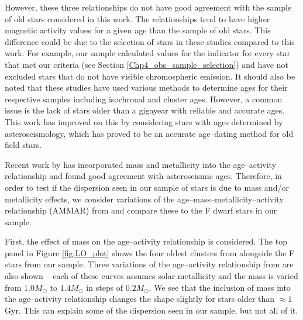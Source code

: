 However, these three relationships do not have good agreement with the sample of old stars considered in this work. The relationships tend to have higher magnetic activity values for a given age than the sample of old stars. This difference could be due to the selection of stars in these studies compared to this work. For example, our sample calculated values for the \Rprime indicator for every star that met our criteria (see Section \ref{Chp4_obs_sample_selection}) and have not excluded stars that do not have visible chromospheric emission. It should also be noted that these studies have used various methods to determine ages for their respective samples including isochronal and cluster ages. However, a common issue is the lack of stars older than a gigayear with reliable and accurate ages. This work has improved on this by considering stars with ages determined by asteroseismology, which has proved to be an accurate age--dating method for old field stars.

Recent work by \citet{Lorenzo_Oliveira_etal_2016} has incorporated mass and metallicity into the age--activity relationship and found good agreement with asteroseismic ages. Therefore, in order to test if the dispersion seen in our sample of stars is due to mass and/or metallicity effects, we consider variations of the age--mass--metallicity--activity relationship (AMMAR) from \citet{Lorenzo_Oliveira_etal_2016} and compare these to the F dwarf stars in our sample.

First, the effect of mass on the age--activity relationship is considered. The top panel in Figure \ref{fig:LO_plot} shows the four oldest clusters from \citet{Mamajek_Hillenbrand_2008} alongside the F stars from our sample. Three variations of the age--activity relationship from \citet{Lorenzo_Oliveira_etal_2016} are also shown -- each of these curves assumes solar metallicity and the mass is varied from $1.0 M_{\odot}$ to $1.4 M_{\odot}$ in steps of $0.2 M_{\odot}$. We see that the inclusion of mass into the age--activity relationship changes the shape slightly for stars older than $\approx 1$ Gyr. This can explain some of the dispersion seen in our sample, but not all of it.

